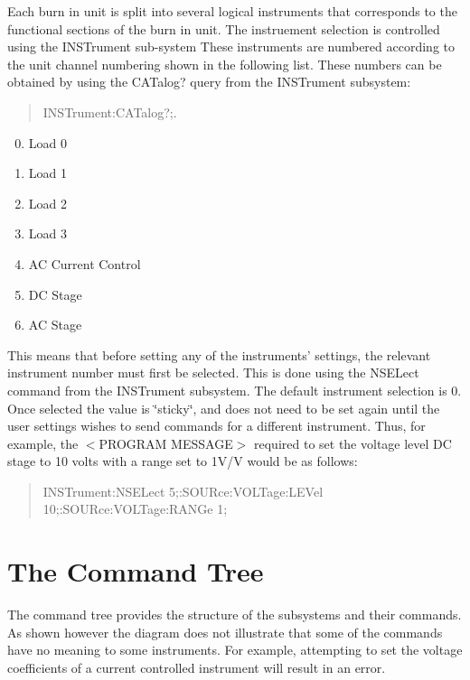 Each burn in unit is split into several logical instruments that corresponds to the functional sections of the burn in unit. The instruement selection is controlled using the {\ttfamily I\-N\-S\-Trument} sub-\/system These instruments are numbered according to the unit channel numbering shown in the following list. These numbers can be obtained by using the {\ttfamily C\-A\-Talog}? query from the {\ttfamily I\-N\-S\-Trument} subsystem\-: \begin{quotation}
{\ttfamily I\-N\-S\-Trument\-:C\-A\-Talog?;}.

\end{quotation}


\begin{enumerate}\setcounter{enumi}{-1} \item Load 0 \item Load 1 \item Load 2 \item Load 3 \item AC Current Control \item DC Stage \item AC Stage \end{enumerate}

This means that before setting any of the instruments' settings, the relevant instrument number must first be selected. This is done using the {\ttfamily N\-S\-E\-Lect} command from the {\ttfamily I\-N\-S\-Trument} subsystem. The default instrument selection is 0. Once selected the value is \char`\"{}sticky\char`\"{}, and does not need to be set again until the user settings wishes to send commands for a different instrument. Thus, for example, the {\ttfamily $<$}P\-R\-O\-G\-R\-A\-M M\-E\-S\-S\-A\-G\-E{\ttfamily $>$} required to set the voltage level D\-C stage to 10 volts with a range set to 1\-V/\-V would be as follows\-: \begin{quotation}
{\ttfamily I\-N\-S\-Trument\-:N\-S\-E\-Lect 5;\-:S\-O\-U\-Rce\-:\-V\-O\-L\-Tage\-:L\-E\-Vel 10;\-:S\-O\-U\-Rce\-:\-V\-O\-L\-Tage\-:R\-A\-N\-Ge 1;}

\end{quotation}
\hypertarget{a00001_tree}{}\section{The Command Tree}\label{a00001_tree}
The command tree provides the structure of the subsystems and their commands. As shown however the diagram does not illustrate that some of the commands have no meaning to some instruments. For example, attempting to set the voltage coefficients of a current controlled instrument will result in an error.

